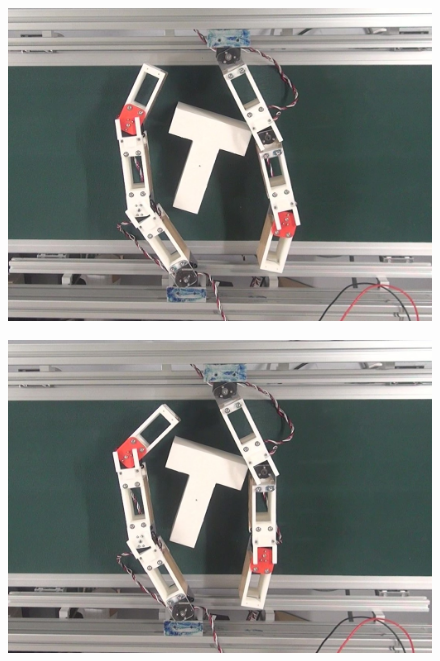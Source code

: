 \documentclass[a4paper,twoside,12pt,papersize, dvipdfmx]{iirthesis}
\begin{document}
\begin{figure}[hbt]
\centering
\begin{minipage}{0.249\hsize}
\centering
\includegraphics[width=0.98\hsize]{fig/4-manipulation-result/TShape/2-1.jpg}
\subcaption{}\label{}
\end{minipage}\hfill
\begin{minipage}{0.249\hsize}
\centering
\includegraphics[width=0.98\hsize]{fig/4-manipulation-result/TShape/2-2.jpg}
\subcaption{}\label{}
\end{minipage}\hfill
\begin{minipage}{0.249\hsize}
\centering

\end{minipage}
\end{figure}
\end{document}
